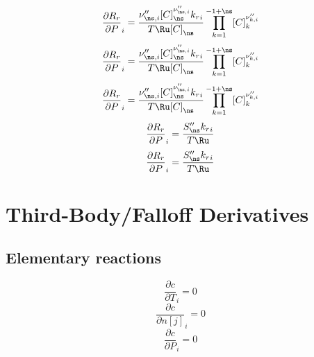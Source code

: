 \documentclass[a4paper,10pt]{article}
\begin{document}
\begin{dmath} \frac{\partial {R_r} }{\partial P }_{i} = \frac{\nu^{\prime\prime}_{\ns,i} [C]_{\ns}^{\nu^{\prime\prime}_{\ns,i}} {k_r}_{i}}{T \Ru [C]_{\ns}} \prod_{k=1}^{-1 + \ns} [C]_{k}^{\nu^{\prime\prime}_{k,i}}\end{dmath} 
\begin{dmath} \frac{\partial {R_r} }{\partial P }_{i} = \frac{\nu^{\prime\prime}_{\ns,i} [C]_{\ns}^{\nu^{\prime\prime}_{\ns,i}} {k_r}_{i}}{T \Ru [C]_{\ns}} \prod_{k=1}^{-1 + \ns} [C]_{k}^{\nu^{\prime\prime}_{k,i}}\end{dmath} 
\begin{dmath} \frac{\partial {R_r} }{\partial P }_{i} = \frac{\nu^{\prime\prime}_{\ns,i} [C]_{\ns}^{\nu^{\prime\prime}_{\ns,i}} {k_r}_{i}}{T \Ru [C]_{\ns}} \prod_{k=1}^{-1 + \ns} [C]_{k}^{\nu^{\prime\prime}_{k,i}}\end{dmath} 
\begin{dmath} \frac{\partial {R_r} }{\partial P }_{i} = \frac{S^{\prime\prime}_{\ns} {k_r}_{i}}{T \Ru}\end{dmath} 
\begin{dmath} \frac{\partial {R_r} }{\partial P }_{i} = \frac{S^{\prime\prime}_{\ns} {k_r}_{i}}{T \Ru}\end{dmath} 
\section{Third-Body\slash Falloff Derivatives}
\subsection{Elementary reactions
}
\begin{dmath} \frac{\partial c }{\partial T }_{i} = 0\end{dmath} 
\begin{dmath} \frac{\partial c }{\partial n[j] }_{i} = 0\end{dmath} 
\begin{dmath} \frac{\partial c }{\partial P }_{i} = 0\end{dmath} 
\end{document}
